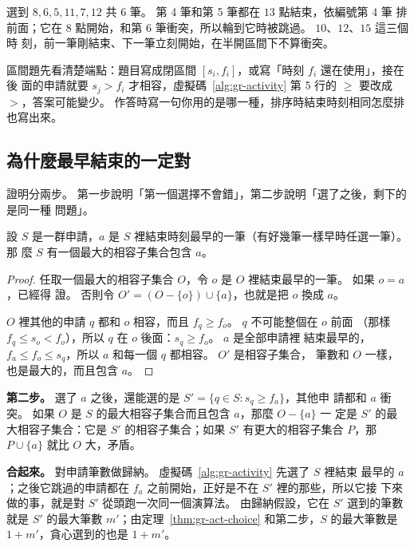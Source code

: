 選到 $8, 6, 5, 11, 7, 12$ 共 $6$ 筆。 第 4 筆和第 5 筆都在 $13$ 點結束，依編號第 4 筆
排前面；它在 $8$ 點開始，和第 6 筆衝突，所以輪到它時被跳過。 $10$、$12$、$15$ 這三個時
刻，前一筆剛結束、下一筆立刻開始，在半開區間下不算衝突。

\begin{examnote}
區間題先看清楚端點：題目寫成閉區間 $[s_i, f_i]$，或寫「時刻 $f_i$ 還在使用」，接在後
面的申請就要 $s_j > f_i$ 才相容，虛擬碼~\ref{alg:gr-activity} 第 5 行的 $\ge$ 要改成
$>$，答案可能變少。 作答時寫一句你用的是哪一種，排序時結束時刻相同怎麼排也寫出來。
\end{examnote}

\subsection{為什麼最早結束的一定對}
\label{sec:gr-act-proof}

證明分兩步。 第一步說明「第一個選擇不會錯」，第二步說明「選了之後，剩下的是同一種
問題」。

\begin{theorem}
\label{thm:gr-act-choice}
設 $S$ 是一群申請，$a$ 是 $S$ 裡結束時刻最早的一筆（有好幾筆一樣早時任選一筆）。 那
麼 $S$ 有一個最大的相容子集合包含 $a$。
\end{theorem}

\begin{proof}
任取一個最大的相容子集合 $O$，令 $o$ 是 $O$ 裡結束最早的一筆。 如果 $o = a$，已經得
證。 否則令 $O' = (O - \{o\}) \cup \{a\}$，也就是把 $o$ 換成 $a$。

$O$ 裡其他的申請 $q$ 都和 $o$ 相容，而且 $f_q \ge f_o$。 $q$ 不可能整個在 $o$ 前面
（那樣 $f_q \le s_o < f_o$），所以 $q$ 在 $o$ 後面：$s_q \ge f_o$。 $a$ 是全部申請裡
結束最早的，$f_a \le f_o \le s_q$，所以 $a$ 和每一個 $q$ 都相容。 $O'$ 是相容子集合，
筆數和 $O$ 一樣，也是最大的，而且包含 $a$。
\end{proof}

\textbf{第二步。} 選了 $a$ 之後，還能選的是 $S' = \{q \in S : s_q \ge f_a\}$，其他申
請都和 $a$ 衝突。 如果 $O$ 是 $S$ 的最大相容子集合而且包含 $a$，那麼 $O - \{a\}$ 一
定是 $S'$ 的最大相容子集合：它是 $S'$ 的相容子集合；如果 $S'$ 有更大的相容子集合
$P$，那 $P \cup \{a\}$ 就比 $O$ 大，矛盾。

\textbf{合起來。} 對申請筆數做歸納。 虛擬碼~\ref{alg:gr-activity} 先選了 $S$ 裡結束
最早的 $a$；之後它跳過的申請都在 $f_a$ 之前開始，正好是不在 $S'$ 裡的那些，所以它接
下來做的事，就是對 $S'$ 從頭跑一次同一個演算法。 由歸納假設，它在 $S'$ 選到的筆數就是
$S'$ 的最大筆數 $m'$；由定理~\ref{thm:gr-act-choice} 和第二步，$S$ 的最大筆數是
$1 + m'$，貪心選到的也是 $1 + m'$。

